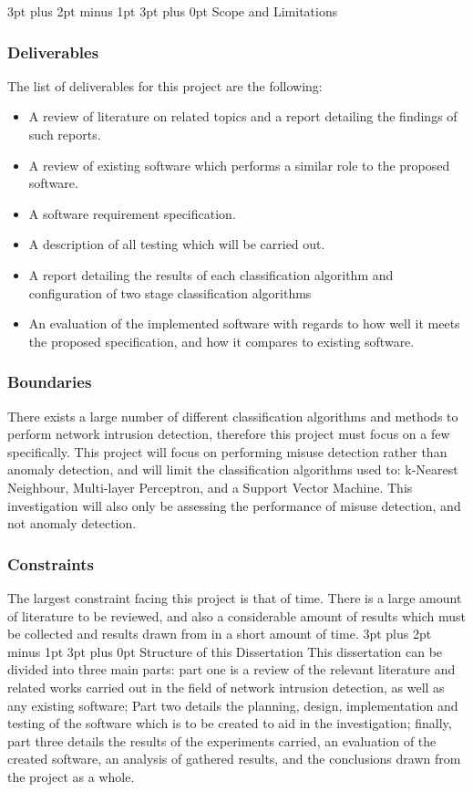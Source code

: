 \documentclass[12pt,a4paper]{article}
\makeatletter
\renewcommand\subsection{\@startsection {subsection}{1}{2mm} %
      {3pt plus 2pt minus 1pt} %
      {3pt plus 0pt} %
      {\normalfont\bfseries}}
\makeatother
\begin{document}
\subsection{Scope and Limitations}
	\subsubsection{Deliverables}
	The list of deliverables for this project are the following:
	\begin{itemize}
	\item{A review of literature on related topics and a report detailing the findings of such reports.}
	\item{A review of existing software which performs a similar role to the proposed software.}
	\item{A software requirement specification.}
	\item{A description of all testing which will be carried out.}
	\item{A report detailing the results of each classification algorithm and configuration of two stage classification algorithms}
	\item{An evaluation of the implemented software with regards to how well it meets the proposed specification, and how it compares to existing software.}
	\end{itemize}
	\subsubsection{Boundaries}
	There exists a large number of different classification algorithms and methods to perform network intrusion detection, therefore this project must focus on a few specifically. This project will focus on performing misuse detection rather than anomaly detection, and will limit the classification algorithms used to: k-Nearest Neighbour, Multi-layer Perceptron, and a Support Vector Machine. This investigation will also only be assessing the performance of misuse detection, and not anomaly detection.
	\subsubsection{Constraints}
	The largest constraint facing this project is that of time. There is a large amount of literature to be reviewed, and also a considerable amount of results which must be collected and results drawn from in a short amount of time.
\subsection{Structure of this Dissertation}
This dissertation can be divided into three main parts: part one is a review of the relevant literature and related works carried out in the field of network intrusion detection, as well as any existing software; Part two details the planning, design, implementation and testing of the software which is to be created to aid in the investigation; finally, part three details the results of the experiments carried, an evaluation of the created software, an analysis of gathered results, and the conclusions drawn from the project as a whole. \\
\end{document}
